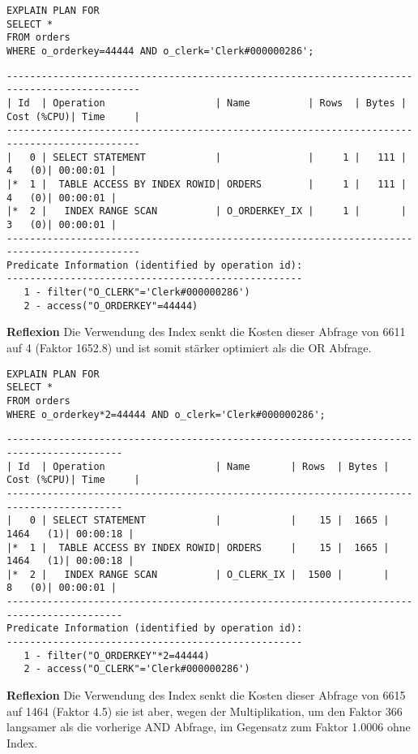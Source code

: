 \documentclass[10pt]{article}
\begin{document}
\begin{lstlisting}[style=sql]
EXPLAIN PLAN FOR
SELECT *
FROM orders
WHERE o_orderkey=44444 AND o_clerk='Clerk#000000286';
\end{lstlisting}
\begin{lstlisting}[style=queryexecutionplan]
---------------------------------------------------------------------------------------------
| Id  | Operation                   | Name          | Rows  | Bytes | Cost (%CPU)| Time     |
---------------------------------------------------------------------------------------------
|   0 | SELECT STATEMENT            |               |     1 |   111 |     4   (0)| 00:00:01 |
|*  1 |  TABLE ACCESS BY INDEX ROWID| ORDERS        |     1 |   111 |     4   (0)| 00:00:01 |
|*  2 |   INDEX RANGE SCAN          | O_ORDERKEY_IX |     1 |       |     3   (0)| 00:00:01 |
---------------------------------------------------------------------------------------------
Predicate Information (identified by operation id):
---------------------------------------------------
   1 - filter("O_CLERK"='Clerk#000000286')
   2 - access("O_ORDERKEY"=44444)
\end{lstlisting}
\textbf{Reflexion} \newline
Die Verwendung des Index senkt die Kosten dieser Abfrage von 6611 auf 4 (Faktor 1652.8) und ist somit stärker optimiert als die OR Abfrage.
\newpage
\begin{lstlisting}[style=sql]
EXPLAIN PLAN FOR
SELECT *
FROM orders
WHERE o_orderkey*2=44444 AND o_clerk='Clerk#000000286';
\end{lstlisting}
\begin{lstlisting}[style=queryexecutionplan]
------------------------------------------------------------------------------------------
| Id  | Operation                   | Name       | Rows  | Bytes | Cost (%CPU)| Time     |
------------------------------------------------------------------------------------------
|   0 | SELECT STATEMENT            |            |    15 |  1665 |  1464   (1)| 00:00:18 |
|*  1 |  TABLE ACCESS BY INDEX ROWID| ORDERS     |    15 |  1665 |  1464   (1)| 00:00:18 |
|*  2 |   INDEX RANGE SCAN          | O_CLERK_IX |  1500 |       |     8   (0)| 00:00:01 |
------------------------------------------------------------------------------------------
Predicate Information (identified by operation id):
---------------------------------------------------
   1 - filter("O_ORDERKEY"*2=44444)
   2 - access("O_CLERK"='Clerk#000000286')
\end{lstlisting}
\textbf{Reflexion} \newline
Die Verwendung des Index senkt die Kosten dieser Abfrage von 6615 auf 1464 (Faktor 4.5) sie ist aber, wegen der Multiplikation, um den Faktor 366 langsamer als die vorherige AND Abfrage, im Gegensatz zum Faktor 1.0006 ohne Index.
\end{document}
